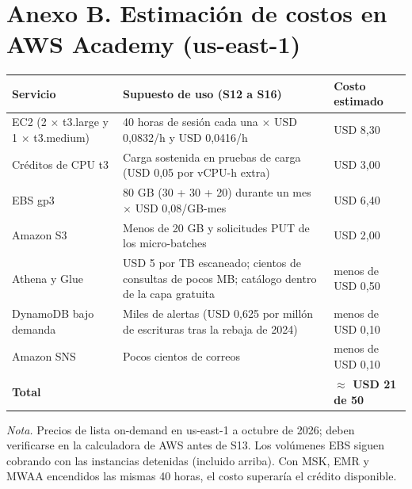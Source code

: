 \documentclass[12pt,letterpaper]{article}
\begin{document}
\section*{Anexo B. Estimación de costos en AWS Academy (us-east-1)}
\begin{footnotesize}
\begin{tabular}{@{}P{1.55in}P{3.3in}P{1.45in}@{}}
\toprule
\textbf{Servicio} & \textbf{Supuesto de uso (S12 a S16)} & \textbf{Costo estimado}\\
\midrule
EC2 (2 $\times$ t3.large y 1 $\times$ t3.medium) & 40 horas de sesión cada una $\times$ USD 0,0832/h y USD 0,0416/h & USD 8,30\\
Créditos de CPU t3 & Carga sostenida en pruebas de carga (USD 0,05 por vCPU-h extra) & USD 3,00\\
EBS gp3 & 80 GB (30 + 30 + 20) durante un mes $\times$ USD 0,08/GB-mes & USD 6,40\\
Amazon S3 & Menos de 20 GB y solicitudes PUT de los micro-batches & USD 2,00\\
Athena y Glue & USD 5 por TB escaneado; cientos de consultas de pocos MB; catálogo dentro de la capa gratuita & menos de USD 0,50\\
DynamoDB bajo demanda & Miles de alertas (USD 0,625 por millón de escrituras tras la rebaja de 2024) & menos de USD 0,10\\
Amazon SNS & Pocos cientos de correos & menos de USD 0,10\\
\midrule
\textbf{Total} & & \textbf{$\approx$ USD 21 de 50}\\
\bottomrule
\end{tabular}

\vspace{3pt}
\noindent\emph{Nota.} Precios de lista on-demand en us-east-1 a octubre de 2026; deben verificarse en la calculadora de AWS antes de S13. Los volúmenes EBS siguen cobrando con las instancias detenidas (incluido arriba). Con MSK, EMR y MWAA encendidos las mismas 40 horas, el costo superaría el crédito disponible.
\end{footnotesize}
\end{document}
